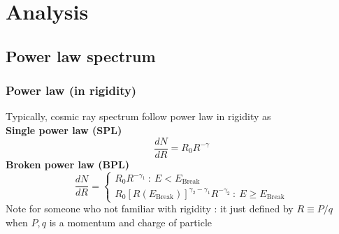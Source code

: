 \documentclass{beamer}
\begin{document}
\section{Analysis}

\subsection{Power law spectrum}
\begin{frame}
  \frametitle{Power law (in rigidity)}
  Typically, cosmic ray spectrum follow power law in rigidity as \\
  \textbf{Single power law (SPL)}
  \begin{equation}
  \frac{dN}{dR} = R_0R^{-\gamma}
  \end{equation}
  \textbf{Broken power law (BPL)}
  \begin{equation}
  \frac{dN}{dR}=
    \begin{cases}
      R_0R^{-\gamma_1}\ :\ E < E_{\text{Break}}\\
      R_0[R(E_{\text{Break}})]^{\gamma_2-\gamma_1}R^{-\gamma_2}\ :\ E \ge E_{\text{Break}}
    \end{cases}
  \end{equation}
  Note for someone who not familiar with rigidity : it just defined by $R\equiv P/q$ when $P, q$ is a momentum and charge of particle
  \end{frame}
\end{document}
